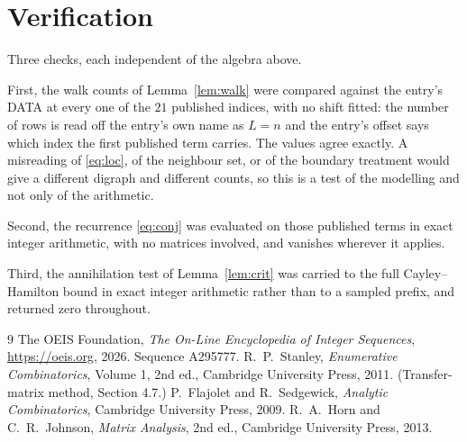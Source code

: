 \documentclass[11pt,a4paper]{article}
\theoremstyle{plain}
\theoremstyle{definition}
\begin{document}
\section{Verification}

Three checks, each independent of the algebra above.

First, the walk counts of Lemma~\ref{lem:walk} were compared against the entry's DATA at
every one of the $21$ published indices, with no shift fitted: the number of rows is
read off the entry's own name as $L=n$ and the entry's offset says which index the first
published term carries. The values agree exactly. A misreading of \eqref{eq:loc}, of the
neighbour set, or of the boundary treatment would give a different digraph and different
counts, so this is a test of the modelling and not only of the arithmetic.

Second, the recurrence \eqref{eq:conj} was evaluated on those published terms in exact
integer arithmetic, with no matrices involved, and vanishes wherever it applies.

Third, the annihilation test of Lemma~\ref{lem:crit} was carried to the full
Cayley--Hamilton bound in exact integer arithmetic rather than to a sampled prefix, and
returned zero throughout.

\begin{thebibliography}{9}
 The OEIS Foundation, \emph{The On-Line Encyclopedia of Integer
Sequences}, \url{https://oeis.org}, 2026. Sequence A295777.
 R.~P.~Stanley, \emph{Enumerative Combinatorics}, Volume 1, 2nd ed.,
Cambridge University Press, 2011. (Transfer-matrix method, Section 4.7.)
 P.~Flajolet and R.~Sedgewick, \emph{Analytic Combinatorics}, Cambridge
University Press, 2009.
 R.~A.~Horn and C.~R.~Johnson, \emph{Matrix Analysis}, 2nd ed., Cambridge
University Press, 2013.
\end{thebibliography}
\end{document}
